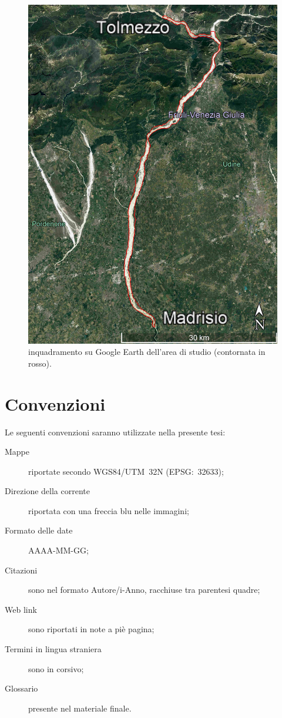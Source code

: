 \begin{figure}
	\centering
	\includegraphics[width=.7\textwidth]{files/overview_gearth.jpg}
	\caption[inquadramento su Google Earth dell'area di studio]{inquadramento su Google Earth dell'area di studio (contornata in rosso).}
	\label{fig:overview-gearth}
\end{figure}



\section{Convenzioni}
Le seguenti convenzioni saranno utilizzate nella presente tesi:
\begin{description}
	\item[Mappe] riportate secondo WGS84/UTM~32N (EPSG:~32633);
	\item[Direzione della corrente] riportata con una freccia blu nelle immagini;
	\item[Formato delle date] AAAA-MM-GG;
	\item[Citazioni] sono nel formato Autore/i-Anno, racchiuse tra parentesi quadre;
	\item[Web link] sono riportati in note a piè pagina;
	\item[Termini in lingua straniera] sono in corsivo;
	\item[Glossario] presente nel materiale finale.
\end{description}



